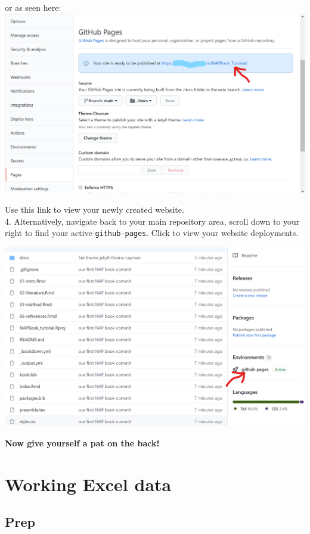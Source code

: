 \documentclass[
]{book}
\let\origfigure\figure
\let\endorigfigure\endfigure
\renewenvironment{figure}[1][2] {
    \expandafter\origfigure\expandafter[H]
} {
    \endorigfigure
}
\begin{document}
or as seen here:
\includegraphics{tutorial_screenshots/gh_pageslink.png}

Use this link to view your newly created website.\\
4. Alternatively, navigate back to your main repository area, scroll down to your right to find your active \texttt{github-pages}. Click to view your website deployments.

\begin{figure}
\centering
\includegraphics{tutorial_screenshots/gh_pages_deploy.png}
\caption{gh pages deployment}
\end{figure}

\textbf{Now give yourself a pat on the back!}

\hypertarget{working-excel-data}{%
\chapter{Working Excel data}\label{working-excel-data}}

\hypertarget{prep}{%
\section{Prep}\label{prep}}
\end{document}
